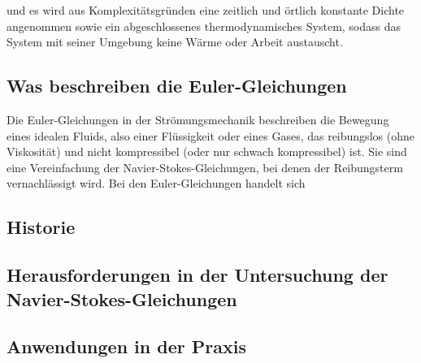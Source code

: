 und es wird aus Komplexitätsgründen eine zeitlich und örtlich konstante Dichte angenommen sowie ein abgeschlossenes thermodynamisches System, sodass das System mit seiner Umgebung keine Wärme oder Arbeit austauscht.

\subsection{Was beschreiben die Euler-Gleichungen}

Die Euler-Gleichungen in der Strömungsmechanik beschreiben die Bewegung eines idealen Fluids, also einer Flüssigkeit oder eines Gases, das reibungslos (ohne Viskosität) und nicht kompressibel (oder nur schwach kompressibel) ist. Sie sind eine Vereinfachung der Navier-Stokes-Gleichungen, bei denen der Reibungsterm vernachlässigt wird. Bei den Euler-Gleichungen handelt sich 

\subsection{Historie}

\subsection{Herausforderungen in der Untersuchung der Navier-Stokes-Gleichungen}

\subsection{Anwendungen in der Praxis}